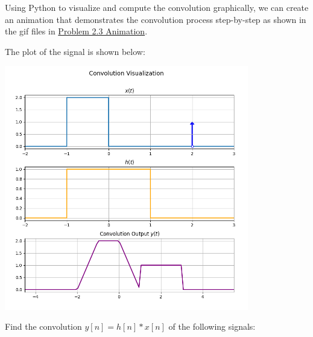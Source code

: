 \documentclass[a4paper, 10pt]{article}
\begin{document}
\begin{tosubmit}
\begin{subproblems}[start=3]
    \item \submitsolution
\end{subproblems}

Using Python to visualize and compute the convolution graphically,
we can create an animation that demonstrates the convolution process step-by-step
as shown in the gif files in \href{https://github.com/patthadon-p/CEDT-2110203-CEM-II/blob/main/signal/homework-2/images/problem_2_3.gif}{Problem 2.3 Animation}.

\vspace{3mm}

The plot of the signal is shown below:
\begin{center}
    \includegraphics[width=0.8\textwidth]{images/problem_2_3_snapshot.png}
\end{center}
\end{tosubmit}

\newpage

\begin{problem}[4]
Find the convolution \( y[n] = h[n] * x[n] \) of the following signals:
\end{problem}
\end{document}
